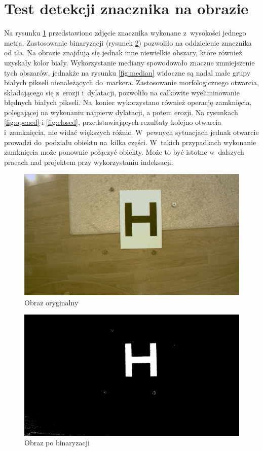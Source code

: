 \section{Test detekcji znacznika na obrazie}
\label{sec:Test wydobycia znacznika}
Na rysunku \ref{fig:h} przedstawiono zdjęcie znacznika wykonane z~wysokości jednego metra. Zastosowanie binaryzacji (rysunek \ref{fig:bin}) pozwoliło na oddzielenie znacznika od tła. Na obrazie znajdują się jednak inne niewielkie obszary, które również uzyskały kolor biały. Wykorzystanie mediany spowodowało znaczne zmniejszenie tych obszarów, jednakże na rysunku \ref{fig:median} widoczne są nadal małe grupy białych pikseli nienależących do~markera. Zastosowanie morfologicznego otwarcia, składającego się z~erozji i~dylatacji,  pozwoliło na całkowite wyeliminowanie błędnych białych pikseli. Na~koniec wykorzystano również operację zamknięcia, polegającej na wykonaniu najpierw dylatacji, a potem erozji. Na rysunkach \ref{fig:opened} i \ref{fig:closed}, przedstawiających rezultaty kolejno otwarcia i~zamknięcia, nie widać większych różnic. W~pewnych sytuacjach jednak otwarcie prowadzi do~podziału obiektu na~kilka części. W~takich przypadkach wykonanie zamknięcia może ponownie połączyć obiekty. Może to być istotne w~dalszych pracach nad projektem przy wykorzystaniu indeksacji. 
\begin{figure}[h]
	\centering
	\includegraphics[width=\textwidth]{h.jpg}
	\caption{Obraz oryginalny}
	\label{fig:h}
\end{figure}
\begin{figure}[h]
	\centering
	\includegraphics[width=\textwidth]{bin.jpg}
	\caption{Obraz po binaryzacji}
	\label{fig:bin}
\end{figure}
